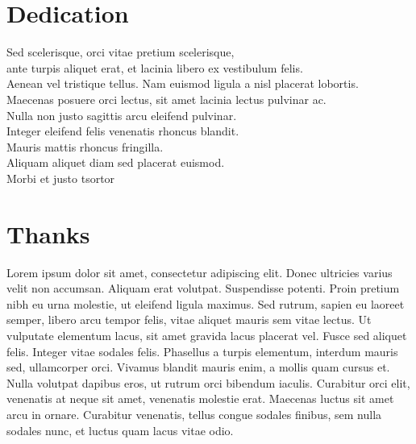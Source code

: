 
\chapter*{Dedication}
\thispagestyle{empty}
%
\begin{center}
  Sed scelerisque, orci vitae pretium scelerisque, ~\\
  ante turpis aliquet erat, et lacinia libero ex vestibulum felis. ~\\
  Aenean vel tristique tellus. Nam euismod ligula a nisl placerat lobortis. ~\\
  Maecenas posuere orci lectus, sit amet lacinia lectus pulvinar ac. ~\\
  Nulla non justo sagittis arcu eleifend pulvinar. ~\\
  Integer eleifend felis venenatis rhoncus blandit. ~\\
  Mauris mattis rhoncus fringilla.~\\
  Aliquam aliquet diam sed placerat euismod. ~\\
  Morbi et justo tsortor ~\\


\end{center}
%
%
%
%
%
%
%
\cleardoublepage%
\chapter*{Thanks}
\thispagestyle{empty}
%
Lorem ipsum dolor sit amet, consectetur adipiscing elit. Donec ultricies varius velit non accumsan. Aliquam erat volutpat. Suspendisse potenti. Proin pretium nibh eu urna molestie, ut eleifend ligula maximus. Sed rutrum, sapien eu laoreet semper, libero arcu tempor felis, vitae aliquet mauris sem vitae lectus. Ut vulputate elementum lacus, sit amet gravida lacus placerat vel. Fusce sed aliquet felis. Integer vitae sodales felis. Phasellus a turpis elementum, interdum mauris sed, ullamcorper orci. Vivamus blandit mauris enim, a mollis quam cursus et. Nulla volutpat dapibus eros, ut rutrum orci bibendum iaculis. Curabitur orci elit, venenatis at neque sit amet, venenatis molestie erat. Maecenas luctus sit amet arcu in ornare. Curabitur venenatis, tellus congue sodales finibus, sem nulla sodales nunc, et luctus quam lacus vitae odio.